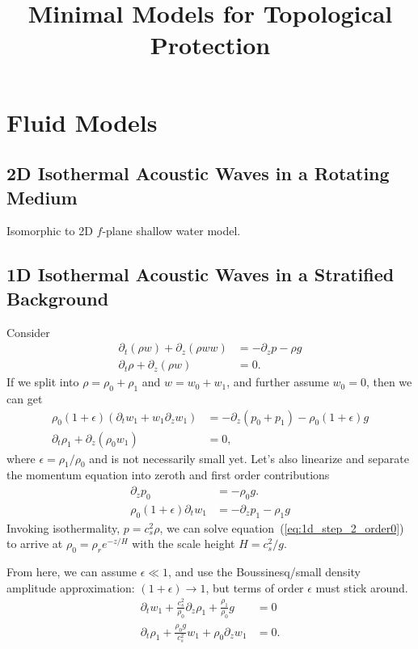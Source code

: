 \documentclass[11pt]{article}
\title{Minimal Models for Topological Protection}
\begin{document}
\maketitle

\section{Fluid Models}
\label{sec:fluids}

\subsection{2D Isothermal Acoustic Waves in a Rotating Medium}
\label{sec:2D_isotherm}
Isomorphic to 2D $f$-plane shallow water model.

\subsection{1D Isothermal Acoustic Waves in a Stratified Background}
\label{sec:1d_acoustic_grav}
Consider
\begin{align}
  \label{eq:1d_start}
  \partial_t \left(\rho w \right) + \partial_z \left(\rho w w \right) &= -\partial_z p - \rho g\\
  \partial_t \rho + \partial_z \left( \rho w \right) &= 0.
\end{align}
If we split into $\rho = \rho_0 + \rho_1$ and $w = w_0 + w_1$, and further assume $w_0 = 0$, then we can get 
\begin{align}
  \label{eq:1d_step_1}
  \rho_0 (1+\epsilon) \left(\partial_t w_1 + w_1 \partial_z w_1 \right) &= -\partial_z \left(p_0 + p_1\right) - \rho_0 (1+\epsilon) g\\
  \partial_t \rho_1 + \partial_z \left( \rho_0 w_1 \right) &= 0,
\end{align}
where $\epsilon = \rho_1/\rho_0$ and is not necessarily small yet.
Let's also linearize and separate the momentum equation into zeroth and first order contributions
\begin{align}
    \partial_z p_0 &= -\rho_0 g.\label{eq:1d_step_2_order0}\\
  \rho_0 (1+\epsilon) \partial_t w_1  &= -\partial_z p_1 - \rho_1 g   \label{eq:1d_step_2}
\end{align}
Invoking isothermality, $p = c_s^2 \rho$, we can solve equation~(\ref{eq:1d_step_2_order0}) to arrive at $\rho_0 = \rho_r e^{-z/H}$ with the scale height $H = c_s^2/g$.

From here, we can assume $\epsilon \ll 1$, and use the Boussinesq/small density amplitude approximation: $(1+\epsilon) \to 1$, but terms of order $\epsilon$ must stick around.
\begin{align}
  \partial_t w_1 +\frac{c_s^2}{\rho_0} \partial_z \rho_1 + \frac{\rho_1}{\rho_0} g &= 0 \label{eq:1d_final_mom}\\
  \partial_t \rho_1 + \frac{\rho_0 g}{c_s^2} w_1 + \rho_0 \partial_z w_1  &= 0.\label{eq:1d_final_density}
\end{align}
\end{document}
